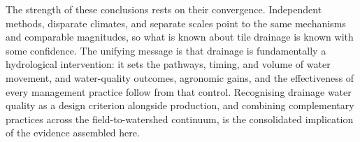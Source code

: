 \documentclass[11pt]{article}
\begin{document}
The strength of these conclusions rests on their convergence. Independent
methods, disparate climates, and separate scales point to the same mechanisms
and comparable magnitudes, so what is known about tile drainage is known with
some confidence. The unifying message is that drainage is fundamentally a
hydrological intervention: it sets the pathways, timing, and volume of water
movement, and water-quality outcomes, agronomic gains, and the effectiveness of
every management practice follow from that control. Recognising drainage water
quality as a design criterion alongside production, and combining complementary
practices across the field-to-watershed continuum, is the consolidated
implication of the evidence assembled here.

\printbibliography
\end{document}
